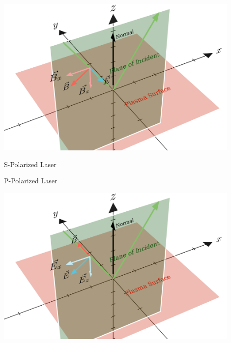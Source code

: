 \documentclass{beamer}
\begin{document}
\begin{frame}
    \begin{minipage}[h]{0.8\linewidth}
        \centering
        \includegraphics[width=0.9\textwidth, height=0.42\textheight]{images/s.png}
        \label{fig:s}
    \end{minipage}
    \begin{minipage}[h]{0.18\linewidth}
        S-Polarized Laser
    \end{minipage}

    \begin{minipage}[h]{0.18\linewidth}
        P-Polarized Laser
    \end{minipage}
    \begin{minipage}[h]{0.8\linewidth}
        \centering
        \includegraphics[width=0.9\textwidth, height=0.42\textheight]{images/p.png}
        \label{fig:p}
    \end{minipage}
\end{frame}
\end{document}
